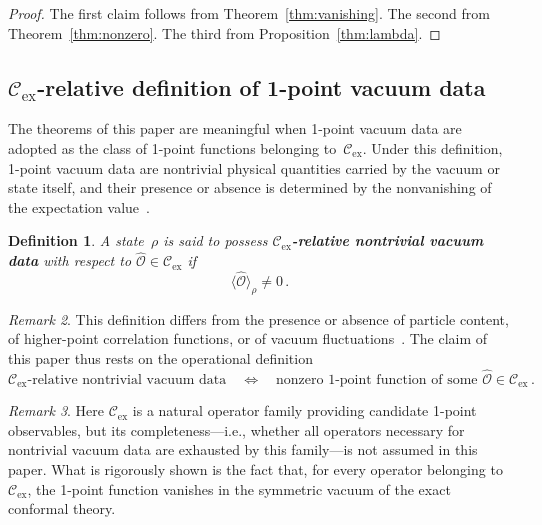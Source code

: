 \documentclass[
  aps,
  prd,
  preprint,
  groupedaddress,
  nofootinbib,
  longbibliography
]{revtex4-2}
\newtheorem{definition}{Definition}[section]
\theoremstyle{remark}
\newtheorem{remark}[definition]{Remark}
\newcommand{\Cex}{\mathcal{C}_{\mathrm{ex}}}
\begin{document}
\begin{proof}
The first claim follows from
Theorem~\ref{thm:vanishing}.
The second from Theorem~\ref{thm:nonzero}.
The third from Proposition~\ref{thm:lambda}.
\end{proof}

\subsection{%
  \texorpdfstring{$\Cex$}{C\_ex}-relative
  definition of 1-point vacuum data}\label{subsec:5-2}

The theorems of this paper are meaningful when 1-point vacuum data
are adopted as the class of 1-point functions belonging
to~$\Cex$.
Under this definition, 1-point vacuum data are nontrivial
physical quantities carried by the vacuum or state itself, and
their presence or absence is determined by the nonvanishing of
the expectation value~\cite{ref2,ref3,ref5,ref9,ref10}.

\begin{definition}\label{def:nontrivial-data}
A state~$\rho$ is said to possess \textbf{$\Cex$-relative
nontrivial vacuum data} with respect to
$\hat{\mathcal{O}}\in\Cex$ if
\begin{equation}\label{eq:nontrivial-data}
  \langle\hat{\mathcal{O}}\rangle_\rho \neq 0\,.
\end{equation}
\end{definition}

\begin{remark}\label{rem:not-particles}
This definition differs from the presence or absence of particle
content, of higher-point correlation functions, or of vacuum
fluctuations~\cite{ref5,ref13,ref14}.
The claim of this paper thus rests on the operational definition
\begin{equation}\label{eq:operational-equiv}
  \text{$\Cex$-relative nontrivial vacuum data}
  \quad\Longleftrightarrow\quad
  \text{nonzero 1-point function of some }
  \hat{\mathcal{O}}\in\Cex\,.
\end{equation}
\end{remark}

\begin{remark}\label{rem:completeness-not-assumed}
Here $\Cex$ is a natural operator family providing candidate
1-point observables, but its completeness---i.e., whether all
operators necessary for nontrivial vacuum data are exhausted by
this family---is not assumed in this paper.
What is rigorously shown is the fact that, for every operator
belonging to~$\Cex$, the 1-point function vanishes in the
symmetric vacuum of the exact conformal theory.
\end{remark}
\end{document}
